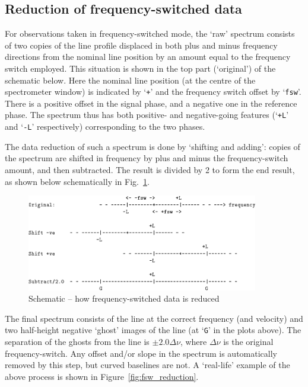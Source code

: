 \documentclass[11pt,twoside]{starlink}
\begin{document}
\subsection{Reduction of frequency-switched data}
\label{sec:fsw-reduction}

For observations taken in frequency-switched mode, the `raw' spectrum
consists of two copies of the line profile displaced in both plus and
minus frequency directions from the nominal line position by an amount
equal to the frequency switch employed. This situation is shown in the
top part (`original') of the schematic below. Here the nominal line
position (at the centre of the spectrometer window) is indicated by
`{\tt{+}}' and the frequency switch offset by `{\tt{fsw}}'. There is a
positive offset in the signal phase, and a negative one in the
reference phase. The spectrum thus has both positive- and
negative-going features (`{\tt{+L}}' and `{\tt{-L}}' respectively)
corresponding to the two phases.

The data reduction of such a spectrum is done by `shifting and
adding': copies of the spectrum are shifted in frequency by plus and
minus the frequency-switch amount, and then subtracted. The result is
divided by 2 to form the end result, as shown below schematically in Fig.~\ref{fig:fsw_schematic}.

\begin{figure}[ht]
\centering
\includegraphics[width=0.9\textwidth]{sc8_fsw-fig}
\caption{Schematic -- how frequency-switched data is reduced}
\label{fig:fsw_schematic}
\end{figure}

The final spectrum consists of the line at the correct frequency (and
velocity) and two half-height negative `ghost' images of the line (at
`{\tt{G}}' in the plots above). The separation of the ghosts from the
line is $\pm2.0\Delta\nu$, where $\Delta\nu$ is the original
frequency-switch. Any offset and/or slope in the spectrum is
automatically removed by this step, but curved baselines are not. A
`real-life' example of the above process is shown in
Figure~\ref{fig:fsw_reduction}.
\end{document}
